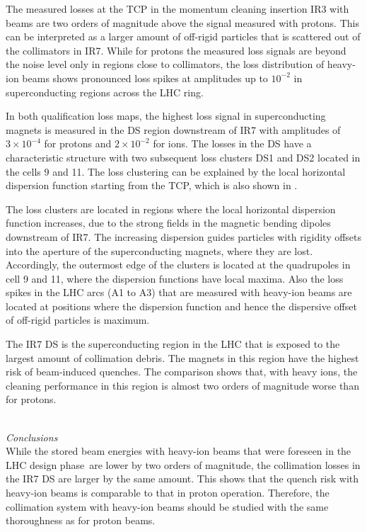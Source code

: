 The measured losses at the TCP in the momentum cleaning insertion IR3 with \lead beams are two orders of magnitude above the signal measured with protons. This can be interpreted as a larger amount of off-rigid particles that is scattered out of the collimators in IR7. While for protons the measured loss signals are beyond the noise level only in regions close to collimators, the loss distribution of heavy-ion beams shows pronounced loss spikes at amplitudes up to $10^{-2}$ in superconducting regions across the LHC ring. 

In both qualification loss maps, the highest loss signal in superconducting magnets is measured in the DS region downstream of IR7 with amplitudes of $3 \times 10^{-4}$ for protons and $2 \times 10^{-2}$ for \lead ions. The losses in the DS have a characteristic structure with two subsequent loss clusters DS1 and DS2 located in the cells 9 and 11. The loss clustering can be explained by the local horizontal dispersion function starting from the TCP, which is also shown in .

The loss clusters are located in regions where the local horizontal dispersion function increases, due to the strong fields in the magnetic bending dipoles downstream of IR7. The increasing dispersion guides particles with rigidity offsets into the aperture of the superconducting magnets, where they are lost. Accordingly, the outermost edge of the clusters is located at the quadrupoles in cell 9 and 11, where the dispersion functions have local maxima. Also the loss spikes in the LHC arcs (A1 to A3) that are measured with heavy-ion beams are located at positions where the dispersion function and hence the dispersive offset of off-rigid particles is maximum.

\newpage
The IR7 DS is the superconducting region in the LHC that is exposed to the largest amount of collimation debris. The magnets in this region have the highest risk of beam-induced quenches. The comparison shows that, with heavy ions, the cleaning performance in this region is almost two orders of magnitude worse than for protons. 


\mbox{} \\ 
\textit{Conclusions} \\
While the stored beam energies with heavy-ion beams that were foreseen in the LHC design phase\citedr\, are lower by two orders of magnitude, the collimation losses in the IR7 DS are larger by the same amount. This shows that the quench risk with heavy-ion beams is comparable to that in proton operation. Therefore, the collimation system with heavy-ion beams should be studied with the same thoroughness as for proton beams. 

